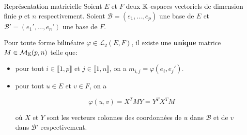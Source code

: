 \documentclass[a4paper,12pt]{article}
\begin{document}
\begin{theoreme}{Représentation matricielle}{}
    Soient $E$ et $F$ deux $\mathbb{K}$-espaces vectoriels de dimension finie $p$ et $n$ respectivement.
    Soient $\mathscr{B} = (e_1, \dots, e_p)$ une base de $E$ et $\mathscr{B'} = (e_1', \dots, e_n')$ une base de $F$.

    Pour toute forme bilinéaire $\varphi \in \mathcal{L}_2(E, F)$, il existe une \textbf{unique} matrice $M \in \mathcal{M}_{\mathbb{K}}(p, n)$ telle que:
    \begin{itemize}
        \item pour tout $i \in \llbracket 1, p \rrbracket$ et $j \in \llbracket 1, n \rrbracket$, on a $m_{i, j} = \varphi(e_i, e_j')$.
        \item pour tout $u \in E$ et $v \in F$, on a
        
        $$\varphi(u, v) = X^T M Y = Y^T X^T M$$

        où $X$ et $Y$ sont les vecteurs colonnes des coordonnées de $u$ dans $\mathscr{B}$ et de $v$ dans $\mathscr{B'}$ respectivement.
    \end{itemize}
\end{theoreme}
\end{document}
